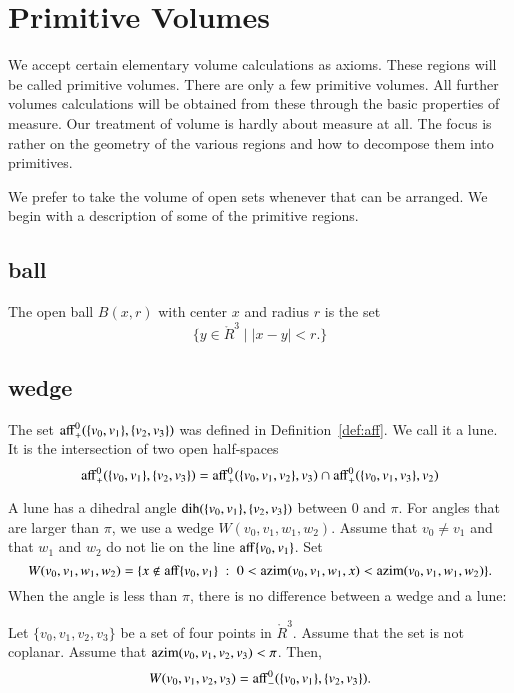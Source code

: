 \section{Primitive Volumes}

We accept 
certain elementary volume calculations as axioms.  
These regions will be called primitive volumes.  There are only
a few primitive volumes.
All further
volumes calculations will be obtained from these through the basic
properties of measure.   
Our treatment of volume 
is hardly about measure at all.  The focus is rather on
the geometry of the various regions and how to decompose them into
primitives.

We prefer to take the volume of open sets whenever that can be
arranged.  We begin with a description of some of the primitive
regions.






\subsection{ball}

\begin{definition}  The open ball $B(x,r)$ with center $x$ and
radius $r$ is the set
    $$
    \{ y\in\ring{R}^3 \mid |x-y| < r.\}
    $$
\end{definition}



\subsection{wedge}


The set ${\operatorname{aff}}^0_+(\{v_0,v_1\},\{v_2,v_3\})$ was defined
in Definition~\ref{def:aff}.  We call it a lune.  It is the intersection
of two open half-spaces
    $$
    {\operatorname{aff}}^0_+(\{v_0,v_1\},\{v_2,v_3\})
    ={\operatorname{aff}}^0_+(\{v_0,v_1,v_2\},v_3)\cap
    {\operatorname{aff}}^0_+(\{v_0,v_1,v_3\},v_2)
    $$


A lune has a dihedral angle $\operatorname{dih}(\{v_0,v_1\},\{v_2,v_3\})$ between
$0$ and $\pi$.   For angles that are larger than $\pi$,  we use a wedge
$W(v_0,v_1,w_1,w_2)$.  Assume that $v_0\ne v_1$ and that
$w_1$ and $w_2$ do not lie on
the line ${\operatorname{aff}}\{v_0,v_1\}$.  Set
$$
W(v_0,v_1,w_1,w_2) = 
  \{x\not\in{\operatorname{aff}}\{v_0,v_1\} \ :\  
  0< {\operatorname{azim}}(v_0,v_1,w_1,x) < {\operatorname{azim}}(v_0,v_1,w_1,w_2)\}.
$$
When the angle is less than $\pi$, there is no difference between
a wedge and a lune:

\begin{lemma} Let $\{v_0,v_1,v_2,v_3\}$ be a set of four points
in $\ring{R}^3$.  Assume that the set is not coplanar.
Assume that ${\operatorname{azim}}(v_0,v_1,v_2,v_3)<\pi$.
Then,
   $$W(v_0,v_1,v_2,v_3) = {\operatorname{aff}}^0_-(\{v_0,v_1\},\{v_2,v_3\}).$$
\end{lemma}



